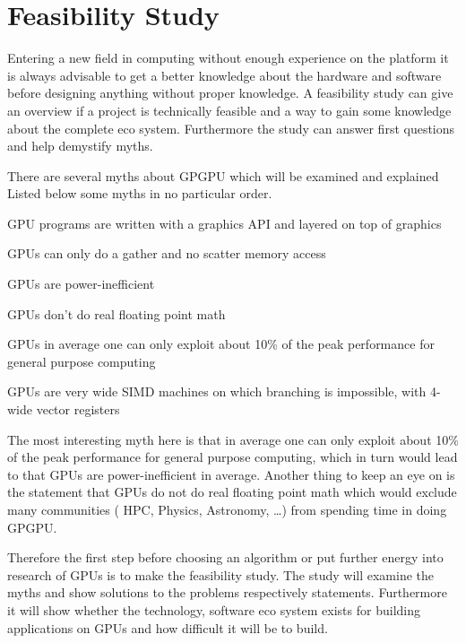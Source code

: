 
\chapter{Feasibility Study}
\label{chap:feas}
Entering a new field in computing without enough experience on the platform it 
is always advisable to get a better knowledge about the hardware and software before
designing anything without proper knowledge. A feasibility study can give an overview
if a project is technically feasible and a way to gain some knowledge about the
complete eco system. Furthermore the study  can answer first questions and help
demystify myths. 

There are several myths about \gls{GPGPU} which will be examined and explained
Listed below some myths in no particular order.
\begin{enum}
	\item \Gls{GPU} programs are written with a graphics \gls{API} and layered on top 
		of graphics
	\label{enum:api}
	\item \Glspl{GPU} can only do a gather and no scatter memory access
	\label{enum:gather}
	\item \Glspl{GPU} are power-inefficient
	\label{enum:ineff}
	\item \Glspl{GPU} don't do real floating point math
	\label{enum:float}
	\item \Glspl{GPU} in average one can only exploit about 10\% of the peak 
		performance for general purpose computing
	\label{enum:exploit}
	\item \Glspl{GPU} are very wide \gls{SIMD} machines on which branching is 	  
		impossible, with 4-wide vector registers
 	\label{enum:simd}
\end{enum}

The most interesting myth here is that in average one can only exploit about
10\% of the peak performance for general purpose computing, which in turn would
lead to that \glspl{GPU} are power-inefficient in average. Another thing to keep
an eye on is the statement that \glspl{GPU} do not do real floating point math
which would exclude many communities ( \gls{HPC}, Physics, Astronomy, \ldots)
 from spending time in doing \gls{GPGPU}.

Therefore the first step before choosing an algorithm or put further energy into
research of \glspl{GPU} is to make the feasibility study. The study will examine
the myths and show solutions to the problems respectively statements.
Furthermore it will show whether the technology, software eco system exists for
building applications on \glspl{GPU} and how difficult it will be to build.

